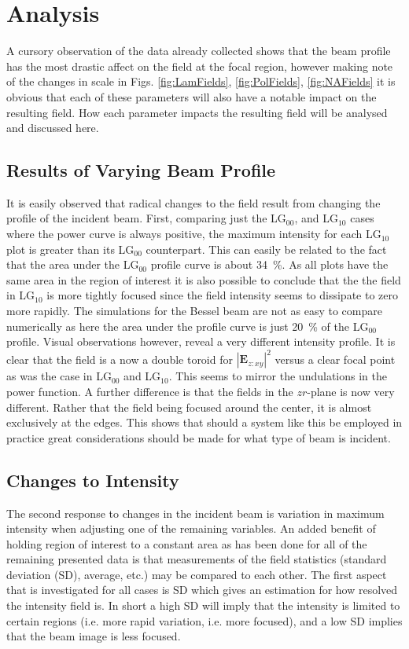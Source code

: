 \documentclass[12pt,a4paper]{article}
\begin{document}
\section{Analysis}
A cursory observation of the data already collected shows that the beam profile has the most drastic affect on the field at the focal region, however making note of the changes in scale in Figs. \ref{fig:LamFields}, \ref{fig:PolFields}, \ref{fig:NAFields} it is obvious that each of these parameters will also have a notable impact on the resulting field. How each parameter impacts the resulting field will be analysed and discussed here.

\subsection{Results of Varying Beam Profile}
\label{VarBeamRes}
It is easily observed that radical changes to the field result from changing the profile of the incident beam. First, comparing just the LG$_{00}$, and LG$_{10}$ cases where the power curve is always positive, the maximum intensity for each LG$_{10}$ plot is greater than its LG$_{00}$ counterpart. This can easily be related to the fact that the area under the LG$_{00}$ profile curve is about \SI{34}{\percent}. As all plots have the same area in the region of interest it is also possible to conclude that the the field in LG$_{10}$ is more tightly focused since the field intensity seems to dissipate to zero more rapidly. The simulations for the Bessel beam are not as easy to compare numerically as here the area under the profile curve is just \SI{20}{\percent} of the LG$_{00}$ profile. Visual observations however, reveal a very different intensity profile. It is clear that the field is a now a double toroid for $|\textbf{E}_{z:xy}|^2$ versus a clear focal point as was the case in LG$_{00}$ and LG$_{10}$. This seems to mirror the undulations in the power function. A further difference is that the fields in the $zr$-plane is now very different. Rather that the field being focused around the center, it is almost exclusively at the edges. This shows that should a system like this be employed in practice great considerations should be made for what type of beam is incident.

\subsection{Changes to Intensity}

The second response to changes in the incident beam is variation in maximum intensity when adjusting one of the remaining variables. An added benefit of holding region of interest to a constant area as has been done for all of the remaining presented data is that measurements of the field statistics (standard deviation (SD), average, etc.) may be compared to each other. The first aspect that is investigated for all cases is SD which gives an estimation for how resolved the intensity field is. In short a high SD will imply that the intensity is limited to certain regions (i.e. more rapid variation, i.e. more focused), and a low SD implies that the beam image is less focused.
\end{document}
